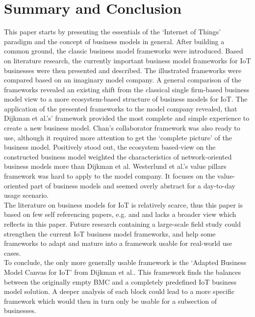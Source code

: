 \section{Summary and Conclusion}
\vspace{-1em}
\label{sec:summary}
	This paper starts by presenting the essentials of the `Internet of Things' paradigm and the concept of business models in general. After building a common ground, the classic business model frameworks were introduced. Based on literature research, the currently important business model frameworks for IoT businesses were then presented and described. The illustrated frameworks were compared based on an imaginary model company. A general comparison of the frameworks revealed an existing shift from the classical single firm-based business model view to a more ecosystem-based structure of business models for IoT. The application of the presented frameworks to the model company revealed, that Dijkman et al.'s' framework provided the most complete and simple experience to create a new business model. Chan's collaborator framework was also ready to use, although it required more attention to get the `complete picture' of the business model. Positively stood out, the ecosystem based-view on the constructed business model weighted the characteristics of network-oriented business models more than Dijkman et al. Westerlund et al.'s value pillars framework was hard to apply to the model company. It focuses on the value-oriented part of business models and seemed overly abstract for a day-to-day usage scenario.\\
	The literature on business models for IoT is relatively scarce, thus this paper is based on few self referencing papers, e.g. \cite{ju} and \cite{dijkman} and lacks a broader view which reflects in this paper. Future research containing a large-scale field study could strengthen the current IoT business model frameworks, and help some frameworks to adapt and mature into a framework usable for real-world use cases.\\
	To conclude, the only more generally usable framework is the `Adapted Business Model Canvas for IoT' from Dijkman et al.. This framework finds the balances between the originally empty BMC and a completely predefined IoT business model solution. A deeper analysis of each block could lead to a more specific framework which would then in turn only be usable for a subsection of businesses.
	\vspace{-10em}
